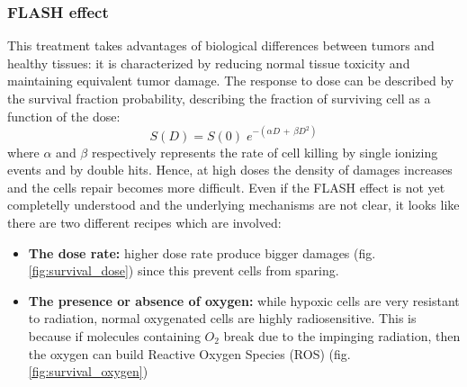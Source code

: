         \subsubsection{FLASH effect}
            This treatment takes advantages of biological differences between tumors and healthy tissues: it is characterized by reducing normal tissue toxicity and maintaining equivalent tumor damage. 
            The response to dose can be described by the survival fraction probability, describing the fraction of surviving cell as a function of the dose: 
            \begin{equation}
                S(D) = S(0)\;e^{-( \alpha D \, + \, \beta D^2)}
                \label{eq:survival_curve}
            \end{equation}
            where $\alpha$ and $\beta$ respectively represents the rate of cell killing by single ionizing events and by double hits. 
            Hence, at high doses the density of damages increases and the cells repair becomes more difficult. 
            Even if the FLASH effect is not yet completelly understood and the underlying mechanisms are not clear, it looks like there are two different recipes which are involved:
            \begin{itemize}
                \item \textbf{The dose rate:} 
                higher dose rate produce bigger damages (fig. \ref{fig:survival_dose}) since this prevent cells from sparing.
                \item \textbf{The presence or absence of oxygen:} 
                while hypoxic cells are very resistant to
                radiation, normal oxygenated cells are highly radiosensitive. 
                This is because if molecules containing $O_2$ break due to the impinging radiation, then the oxygen can build Reactive Oxygen Species (ROS) (fig.\ref{fig:survival_oxygen})
            \end{itemize} 
